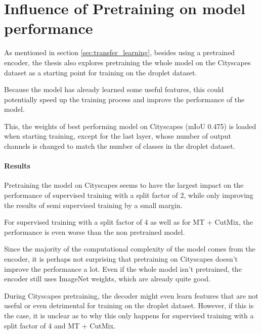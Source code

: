 \section{Influence of Pretraining on model performance}
\label{sec:pretraining}

As mentioned in section \ref{sec:transfer_learning}, besides using a pretrained encoder, the thesis also explores pretraining the whole model on the Cityscapes dataset as a starting point for training on the droplet dataset.

Because the model has already learned some useful features, this could potentially speed up the training process and improve the performance of the model. 

This, the weights of best performing model on Cityscapes (mIoU \num{0.475}) is loaded when starting training, except for the last layer, whose number of output channels is changed to match the number of classes in the droplet dataset.

\paragraph{Results}

Pretraining the model on Cityscapes seems to have the largest impact on the performance of supervised training with a split factor of 2, while only improving the results of semi supervised training by a small margin.

For supervised training with a split factor of 4 as well as for MT + CutMix, the performance is even worse than the non pretrained model.

Since the majority of the computational complexity of the model comes from the encoder, it is perhaps not surprising that pretraining on Cityscapes doesn't improve the performance a lot. 
Even if the whole model isn't pretrained, the encoder still uses ImageNet weights, which are already quite good. 

During Cityscapes pretraining, the decoder might even learn features that are not useful or even detrimental for training on the droplet dataset.
However, if this is the case, it is unclear as to why this only happens for supervised training with a split factor of 4 and MT + CutMix.

